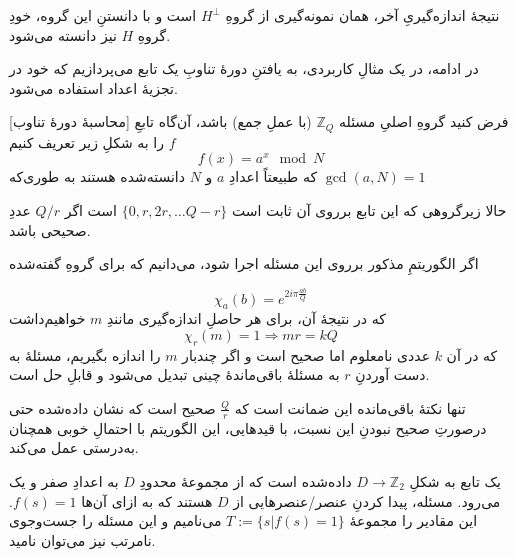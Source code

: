 \documentclass[a4paper,12pt]{article}
\begin{document}
نتیجهٔ اندازه‌گیریِ آخر، همان نمونه‌گیری از گروهِ \(H^\perp\) است و با دانستنِ این گروه، خودِ گروهِ \(H\) نیز دانسته می‌شود.

در ادامه، در یک مثالِ کاربردی، به یافتنِ دورهٔ تناوبِ یک تابع می‌پردازیم که خود در تجزیهٔ اعداد استفاده می‌شود.

[محاسبهٔ دورهٔ تناوب]
فرض کنید گروهِ اصلیِ مسئله
\(\mathbb{Z}_{Q}\)
(با عملِ جمع) باشد، آن‌گاه تابعِ \(f\) را به شکلِ زیر تعریف کنیم
\begin{equation}
 f(x) = a^x \mod N
\end{equation}
که طبیعتاً اعدادِ \(a\) و \(N\) دانسته‌شده هستند به طوری‌که 
\(\gcd(a, N) = 1\)

حالا زیرگروهی که این تابع برروی آن ثابت است
\(\{ 0, r, 2r, \dots Q - r \}\)
است اگر \(Q/r\) عددِ صحیحی باشد.

اگر الگوریتمِ مذکور برروی این مسئله اجرا شود، می‌دانیم که برای گروهِ گفته‌شده

\begin{equation}
    \chi_a(b) = e^{2i\pi\frac{ab}{Q}}
\end{equation}
که در نتیجهٔ آن، برای هر حاصلِ اندازه‌گیری مانندِ \(m\) خواهیم‌داشت
\begin{equation}
    \chi_r(m) = 1 \Rightarrow mr = kQ
\end{equation}
که در آن \(k\) عددی نامعلوم اما صحیح است و اگر چندبار \(m\) را اندازه بگیریم، مسئلهٔ به دست آوردنِ \(r\) به مسئلهٔ باقی‌ماندهٔ چینی تبدیل می‌شود و قابلِ حل است.

تنها نکتهٔ باقی‌مانده این ضمانت است که \(\frac{Q}{r}\) صحیح است که نشان داده‌شده حتی درصورتِ صحیح نبودنِ این نسبت، با قیدهایی، این الگوریتم با احتمالِ خوبی همچنان به‌درستی عمل می‌کند.


یک تابع به شکلِ
$D \to \mathbb{Z}_2$
داده‌شده است که از مجموعهٔ محدودِ $D$ به اعدادِ صفر و یک می‌رود.
مسئله، پیدا کردنِ عنصر/عنصرهایی از $D$ هستند که به ازای آن‌ها
$f(s) = 1$.
این مقادیر را مجموعهٔ 
$T := \{ s | f(s) = 1\}$
 می‌نامیم و
این مسئله را جست‌وجوی نامرتب نیز می‌توان نامید.
\end{document}
